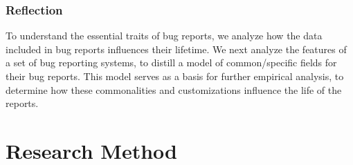%
%
%

\subsubsection{Reflection} To understand the essential traits of bug reports, we analyze how the data included in bug reports influences their lifetime.
We next analyze the features of a set of bug reporting systems, to distill a model of common/specific fields for their bug reports.
This model serves as a basis for further empirical analysis, to determine how these commonalities and customizations influence the life of the reports.


\section{Research Method}\label{sec:model-method}

